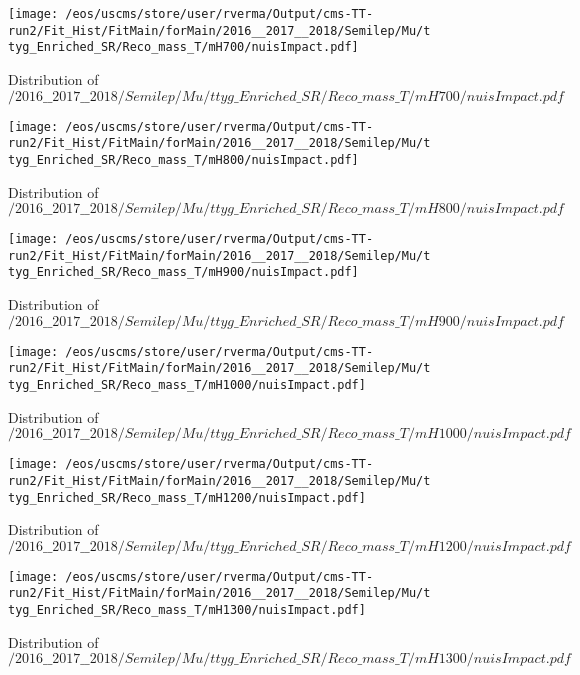 \begin{figure}
\centering
\texttt{[image: /eos/uscms/store/user/rverma/Output/cms-TT-run2/Fit\_Hist/FitMain/forMain/2016\_\_2017\_\_2018/Semilep/Mu/ttyg\_Enriched\_SR/Reco\_mass\_T/mH700/nuisImpact.pdf]}
\caption{Distribution of $/2016\_\_2017\_\_2018/Semilep/Mu/ttyg\_Enriched\_SR/Reco\_mass\_T/mH700/nuisImpact.pdf$}
\end{figure}

\begin{figure}
\centering
\texttt{[image: /eos/uscms/store/user/rverma/Output/cms-TT-run2/Fit\_Hist/FitMain/forMain/2016\_\_2017\_\_2018/Semilep/Mu/ttyg\_Enriched\_SR/Reco\_mass\_T/mH800/nuisImpact.pdf]}
\caption{Distribution of $/2016\_\_2017\_\_2018/Semilep/Mu/ttyg\_Enriched\_SR/Reco\_mass\_T/mH800/nuisImpact.pdf$}
\end{figure}

\begin{figure}
\centering
\texttt{[image: /eos/uscms/store/user/rverma/Output/cms-TT-run2/Fit\_Hist/FitMain/forMain/2016\_\_2017\_\_2018/Semilep/Mu/ttyg\_Enriched\_SR/Reco\_mass\_T/mH900/nuisImpact.pdf]}
\caption{Distribution of $/2016\_\_2017\_\_2018/Semilep/Mu/ttyg\_Enriched\_SR/Reco\_mass\_T/mH900/nuisImpact.pdf$}
\end{figure}

\begin{figure}
\centering
\texttt{[image: /eos/uscms/store/user/rverma/Output/cms-TT-run2/Fit\_Hist/FitMain/forMain/2016\_\_2017\_\_2018/Semilep/Mu/ttyg\_Enriched\_SR/Reco\_mass\_T/mH1000/nuisImpact.pdf]}
\caption{Distribution of $/2016\_\_2017\_\_2018/Semilep/Mu/ttyg\_Enriched\_SR/Reco\_mass\_T/mH1000/nuisImpact.pdf$}
\end{figure}

\begin{figure}
\centering
\texttt{[image: /eos/uscms/store/user/rverma/Output/cms-TT-run2/Fit\_Hist/FitMain/forMain/2016\_\_2017\_\_2018/Semilep/Mu/ttyg\_Enriched\_SR/Reco\_mass\_T/mH1200/nuisImpact.pdf]}
\caption{Distribution of $/2016\_\_2017\_\_2018/Semilep/Mu/ttyg\_Enriched\_SR/Reco\_mass\_T/mH1200/nuisImpact.pdf$}
\end{figure}

\begin{figure}
\centering
\texttt{[image: /eos/uscms/store/user/rverma/Output/cms-TT-run2/Fit\_Hist/FitMain/forMain/2016\_\_2017\_\_2018/Semilep/Mu/ttyg\_Enriched\_SR/Reco\_mass\_T/mH1300/nuisImpact.pdf]}
\caption{Distribution of $/2016\_\_2017\_\_2018/Semilep/Mu/ttyg\_Enriched\_SR/Reco\_mass\_T/mH1300/nuisImpact.pdf$}
\end{figure}

